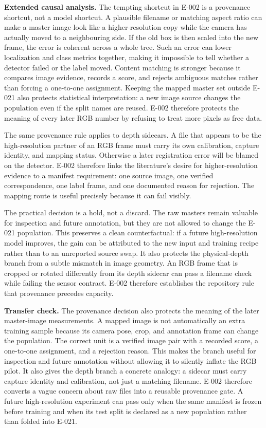 \documentclass[preprint,12pt]{elsarticle}
\begin{document}
\textbf{Extended causal analysis.} The tempting shortcut in E-002 is a
provenance shortcut, not a model shortcut. A plausible filename or matching
aspect ratio can make a master image look like a higher-resolution copy while
the camera has actually moved to a neighbouring side. If the old box is then
scaled into the new frame, the error is coherent across a whole tree. Such an
error can lower localization and class metrics together, making it impossible
to tell whether a detector failed or the label moved. Content matching is
stronger because it compares image evidence, records a score, and rejects
ambiguous matches rather than forcing a one-to-one assignment. Keeping the
mapped master set outside E-021 also protects statistical interpretation: a
new image source changes the population even if the split names are reused.
E-002 therefore protects the meaning of every later RGB number by refusing to
treat more pixels as free data.

The same provenance rule applies to depth sidecars. A file that appears to be
the high-resolution partner of an RGB frame must carry its own calibration,
capture identity, and mapping status. Otherwise a later registration error
will be blamed on the detector. E-002 therefore links the literature's desire
for higher-resolution evidence to a manifest requirement: one source image,
one verified correspondence, one label frame, and one documented reason for
rejection. The mapping route is useful precisely because it can fail visibly.

The practical decision is a hold, not a discard. The raw masters remain
valuable for inspection and future annotation, but they are not allowed to
change the E-021 population. This preserves a clean counterfactual: if a
future high-resolution model improves, the gain can be attributed to the new
input and training recipe rather than to an unreported source swap. It also
protects the physical-depth branch from a subtle mismatch in image geometry.
An RGB frame that is cropped or rotated differently from its depth sidecar
can pass a filename check while failing the sensor contract. E-002 therefore
establishes the repository rule that provenance precedes capacity.

\textbf{Transfer check.} The provenance decision also protects the meaning of
the later master-image measurements. A mapped image is not automatically an
extra training sample because its camera pose, crop, and annotation frame can
change the population. The correct unit is a verified image pair with a
recorded score, a one-to-one assignment, and a rejection reason. This makes
the branch useful for inspection and future annotation without allowing it to
silently inflate the RGB pilot. It also gives the depth branch a concrete
analogy: a sidecar must carry capture identity and calibration, not just a
matching filename. E-002 therefore converts a vague concern about raw files
into a reusable provenance gate. A future high-resolution experiment can pass
only when the same manifest is frozen before training and when its test split
is declared as a new population rather than folded into E-021.
\end{document}
